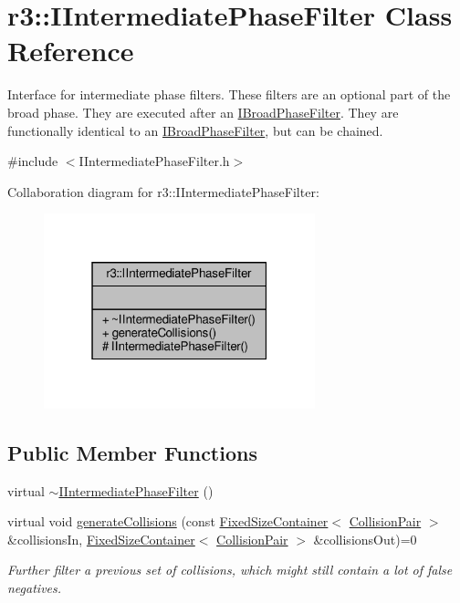 \hypertarget{classr3_1_1_i_intermediate_phase_filter}{}\section{r3\+:\+:I\+Intermediate\+Phase\+Filter Class Reference}
\label{classr3_1_1_i_intermediate_phase_filter}


Interface for intermediate phase filters. These filters are an optional part of the broad phase. They are executed after an \mbox{\hyperlink{classr3_1_1_i_broad_phase_filter}{I\+Broad\+Phase\+Filter}}. They are functionally identical to an \mbox{\hyperlink{classr3_1_1_i_broad_phase_filter}{I\+Broad\+Phase\+Filter}}, but can be chained.  




{\ttfamily \#include $<$I\+Intermediate\+Phase\+Filter.\+h$>$}



Collaboration diagram for r3\+:\+:I\+Intermediate\+Phase\+Filter\+:\nopagebreak
\begin{figure}[H]
\begin{center}
\leavevmode
\includegraphics[width=223pt]{classr3_1_1_i_intermediate_phase_filter__coll__graph}
\end{center}
\end{figure}
\subsection*{Public Member Functions}
\begin{DoxyCompactItemize}
\item 
virtual \mbox{\hyperlink{classr3_1_1_i_intermediate_phase_filter_ab2257ec90263c444371f455078e5ff7c}{$\sim$\+I\+Intermediate\+Phase\+Filter}} ()
\item 
virtual void \mbox{\hyperlink{classr3_1_1_i_intermediate_phase_filter_aea93ab8a004408c54409b27961db6425}{generate\+Collisions}} (const \mbox{\hyperlink{classr3_1_1_fixed_size_container}{Fixed\+Size\+Container}}$<$ \mbox{\hyperlink{classr3_1_1_collision_pair}{Collision\+Pair}} $>$ \&collisions\+In, \mbox{\hyperlink{classr3_1_1_fixed_size_container}{Fixed\+Size\+Container}}$<$ \mbox{\hyperlink{classr3_1_1_collision_pair}{Collision\+Pair}} $>$ \&collisions\+Out)=0
\begin{DoxyCompactList}\small\item\em Further filter a previous set of collisions, which might still contain a lot of false negatives. \end{DoxyCompactList}\end{DoxyCompactItemize}
